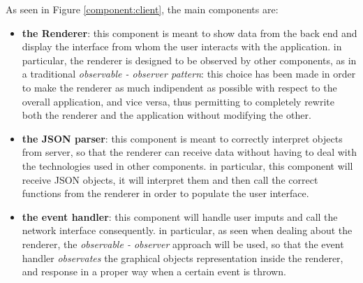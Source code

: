 As seen in Figure \ref{component:client}, the main components are:
\begin{itemize}
<<<<<<< HEAD
    \item \textbf{the Renderer}: this component is meant to show data from the back end and display the interface from whom the user interacts with the application.
                                 in particular, the renderer is designed to be observed by other components, as in a traditional \emph{observable - observer pattern}:
                                 this choice has been made in order to make the renderer as much indipendent as possible with respect to the overall application, and
                                 vice versa, thus permitting to completely rewrite both the renderer and the application without modifying the other. 
                    
    \item \textbf{the JSON parser}: this component is meant to correctly interpret objects from server, so that the renderer can receive data without having to deal
                                    with the technologies used in other components. in particular, this component will receive JSON objects, it will interpret them and
                                    then call the correct functions from the renderer in order to populate the user interface.
                                    
    \item \textbf{the event handler}: this component will handle user imputs and call the network interface consequently. in particular, as seen when dealing about the 
                                      renderer, the \emph{observable - observer} approach will be used, so that the event handler \emph{observates} the graphical objects
                                      representation inside the renderer, and response in a proper way when a certain event is thrown.
                        

\end{itemize}
